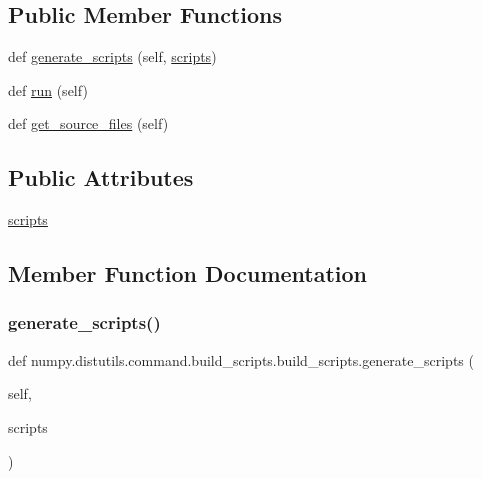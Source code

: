 \subsection*{Public Member Functions}
\begin{DoxyCompactItemize}
\item 
def \hyperlink{classnumpy_1_1distutils_1_1command_1_1build__scripts_1_1build__scripts_a9c9cc6be6ccbbb3504df76cfc4fd09dc}{generate\+\_\+scripts} (self, \hyperlink{classnumpy_1_1distutils_1_1command_1_1build__scripts_1_1build__scripts_a29a7c38e55090ee11c0daf0467b238b5}{scripts})
\item 
def \hyperlink{classnumpy_1_1distutils_1_1command_1_1build__scripts_1_1build__scripts_af12e8a758df8e657ae7dd31431202f7b}{run} (self)
\item 
def \hyperlink{classnumpy_1_1distutils_1_1command_1_1build__scripts_1_1build__scripts_ae6751724b939b25c8631f3d94fe00cb1}{get\+\_\+source\+\_\+files} (self)
\end{DoxyCompactItemize}
\subsection*{Public Attributes}
\begin{DoxyCompactItemize}
\item 
\hyperlink{classnumpy_1_1distutils_1_1command_1_1build__scripts_1_1build__scripts_a29a7c38e55090ee11c0daf0467b238b5}{scripts}
\end{DoxyCompactItemize}


\subsection{Member Function Documentation}
\mbox{\label{classnumpy_1_1distutils_1_1command_1_1build__scripts_1_1build__scripts_a9c9cc6be6ccbbb3504df76cfc4fd09dc}} 
\subsubsection{\texorpdfstring{generate\+\_\+scripts()}{generate\_scripts()}}
{\footnotesize\ttfamily def numpy.\+distutils.\+command.\+build\+\_\+scripts.\+build\+\_\+scripts.\+generate\+\_\+scripts (\begin{DoxyParamCaption}\item[{}]{self,  }\item[{}]{scripts }\end{DoxyParamCaption})}

